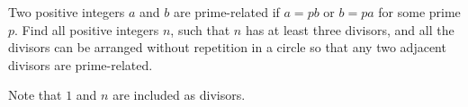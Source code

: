 Two positive integers $a$ and $b$ are prime-related if $a = pb$ or $b = pa$ for some prime $p$. Find all positive integers $n$,  such that $n$ has at least three divisors, and all the divisors can be arranged without repetition in a circle so that any two adjacent divisors are prime-related.

Note that $1$ and $n$ are included as divisors.
